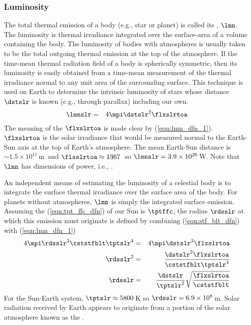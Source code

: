 \documentclass[12pt]{article}
\begin{document}
\subsubsection[Luminosity]{Luminosity}\label{sxn:lmn}
The total thermal emission of a body (e.g., star or planet) is called  
its , $\lmn$.
The luminosity is thermal irradiance integrated over the surface-area
of a volume containing the body.
The luminosity of bodies with atmospheres is usually taken to be
the total outgoing thermal emission at the top of the atmosphere.
If the time-mean thermal radiation field of a body is spherically
symmetric, then its luminosity is easily obtained from a time-mean
measurement of the thermal irradiance normal to any unit area of the
surrounding surface.
This technique is used on Earth to determine the intrinsic luminosity
of stars whose distance $\dstslr$ is known (e.g., through parallax)
including our own.
\begin{eqnarray}
\lmnslr & = & 4\mpi\dstslr^{2} \flxslrtoa
\label{eqn:lmn_dfn_1}
\end{eqnarray}
The meaning of the  $\flxslrtoa$ is made clear
by (\ref{eqn:lmn_dfn_1}).
$\flxslrtoa$ is the solar irradiance that would be measured normal to
the Earth-Sun axis at the top of Earth's atmosphere.
The mean Earth-Sun distance is $\sim 1.5 \times 10^{11}$\,m\ and 
$\flxslrtoa \approx 1367$\,\wxmS\ so 
$\lmnslr = 3.9 \times 10^{26}$\,W.
Note that $\lmn$ has dimensions of power, i.e., \jxs.

An independent means of estimating the luminosity of a celestial body 
is to integrate the surface thermal irradiance over the surface area
of the body.
For planets without atmospheres, $\lmn$ is simply the integrated
surface emission. 
Assuming the  (\ref{eqn:tpt_ffc_dfn}) of
our Sun is $\tptffc$, the radius $\rdsslr$ at which this emission must
originate is defined by combining (\ref{eqn:stf_blt_dfn}) with
(\ref{eqn:lmn_dfn_1})
\begin{eqnarray}
4\mpi\rdsslr^{2} \cststfblt \tptslr^{4} & = & 4\mpi\dstslr^{2} \flxslrtoa 
\nonumber \\
\rdsslr^{2} & = & \frac{\dstslr^{2} \flxslrtoa}{\cststfblt \tptslr^{4}} 
\nonumber \\
\rdsslr & = &
\frac{\dstslr}{\tptslr^{2}}\sqrt{\frac{\flxslrtoa}{\cststfblt}} 
\label{eqn:rds_slr_dfn}
\end{eqnarray}
For the Sun-Earth system, $\tptslr \approx 5800$\,K so
$\rdsslr = 6.9 \times 10^{8}$\,m. 
Solar radiation received by Earth appears to originate from a portion
of the solar atmosphere known as the . 
\end{document}
